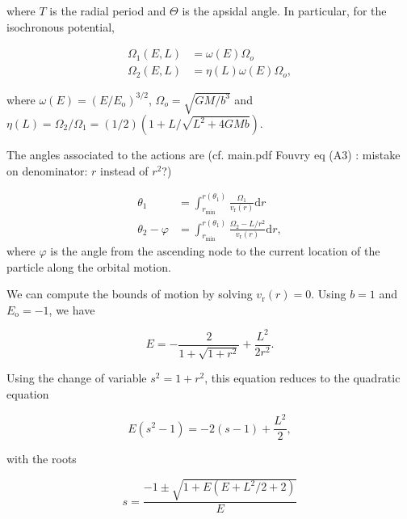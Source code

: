 \documentclass[11pt]{article}
\newcommand{\rr}{\mathrm{r}}
\newcommand{\ro}{\mathrm{o}}
\newcommand{\Eo}{E_{\ro}}
\newcommand{\vr}{v_{\rr}}
\newcommand{\rd}{{\mathrm{d}}}
\newcommand{\rmin}{r_{\min}}
\begin{document}
where $T$ is the radial period and $\Theta$ is the apsidal angle. In particular, for the isochronous potential,

\begin{align*}
  \Omega_{1} (E,L)&= \omega(E) \Omega_{o} \\
  \Omega_{2} (E,L)&= \eta(L) \omega(E) \Omega_{o} ,
\end{align*}

where $\omega(E) = (E/\Eo)^{3/2}$, $\Omega_{o}=\sqrt{GM/b^{3}}$ and $\eta(L)=\Omega_{2}/\Omega_{1}=(1/2)(1+L/\sqrt{L^{2}+4GMb})$.

The angles associated to the actions are (cf. main.pdf Fouvry eq (A3) : mistake on denominator: $r$ instead of $r^{2}$?)

\begin{align*}
  \theta_{1} &= \int_{\rmin}^{r(\theta_{1})} \frac{\Omega_{1}}{\vr(r)} \rd r \\
  \theta_{2} - \varphi &= \int_{\rmin}^{r(\theta_{1})} \frac{\Omega_{2} - L/r^{2}}{\vr(r)} \rd r,
  \end{align*}
where $\varphi$ is the angle from the ascending node to the current location
of the particle along the orbital motion.

We can compute the bounds of motion by solving $\vr(r)=0$. Using $b=1$ and $\Eo=-1$, we have

$$E=-\frac{2}{1+\sqrt{1+r^{2}}} + \frac{L^{2}}{2r^{2}} .$$
  
Using the change of variable $s^{2}=1+r^{2}$, this equation reduces to the quadratic equation

$$E(s^{2}-1) = -2(s-1) + \frac{L^{2}}{2} ,$$

with the roots

$$s = \frac{-1 \pm \sqrt{1+E(E+L^{2}/2+2)}}{E}$$
\end{document}
